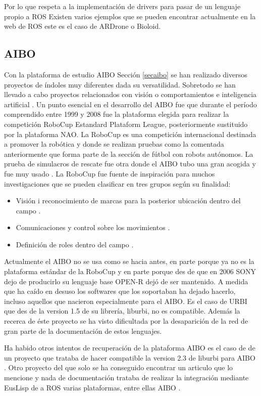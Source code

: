 \documentclass[12pt,a4paper,final,twoside]{book}
\begin{document}
Por lo que respeta a la implementación de drivers para pasar de un lenguaje propio a ROS Existen varios ejemplos que se pueden encontrar actualmente en la web de ROS este es el caso de ARDrone o Bioloid. 

\subsection{AIBO}

Con la plataforma de estudio AIBO Sección \ref{secaibo} se han realizado diversos proyectos de índoles muy diferentes dada su versatilidad. Sobretodo se han llevado a cabo proyectos relacionados con visión \cite{xavi} o comportamientos e inteligencia artificial \cite{riki}.
Un punto esencial en el desarrollo del AIBO fue que durante el período comprendido entre 1999 y 2008 fue la plataforma elegida para realizar la competición RoboCup Estandard Plataform League, posteriormente sustituido por la plataforma NAO. La RoboCup es una competición internacional destinada a promover la robótica y donde se realizan pruebas como la comentada anteriormente que forma parte de la sección de fútbol con robots autónomos. La prueba de simulacros de rescate fue otra donde el AIBO tubo una gran acogida y fue muy usado \cite{robocup}.
La RoboCup fue fuente de inspiración para muchos investigaciones que se pueden clasificar en tres grupos según su finalidad:
\begin{itemize}
\item Visión i reconocimiento de marcas para la posterior ubicación dentro del campo \cite{morales}.
\item Comunicaciones y control sobre los movimientos \cite{jesus}.
\item Definición de roles dentro del campo \cite{metod}.
\end{itemize}

Actualmente el AIBO no se usa como se hacia antes, en parte porque ya no es la plataforma estándar de la RoboCup y en parte porque des de que en 2006 SONY dejo de producirlo su lenguaje base OPEN-R\cite{OPEN-R PG} dejó de ser mantenido.
A medida que ha caído en desuso los softwares que los soportaban ha dejado hacerlo, incluso aquellos que nacieron especialmente para el AIBO. Es el caso de URBI que des de la version 1.5 de su librería, liburbi, no es compatible.
Además la recerca de éste proyecto se ha visto dificultada por la desaparición de la red de gran parte de la documentación de estos lenguajes.

Ha habido otros intentos de recuperación de la plataforma AIBO es el caso de de un proyecto que trataba de hacer compatible la version 2.3 de liburbi para AIBO \cite{kecsap}.
Otro proyecto del que solo se ha conseguido encontrar un articulo que lo mencione y nada de documentación  trataba de realizar la integración mediante EusLisp de a ROS varias plataformas, entre ellas AIBO \cite{euslisp}.
\end{document}
